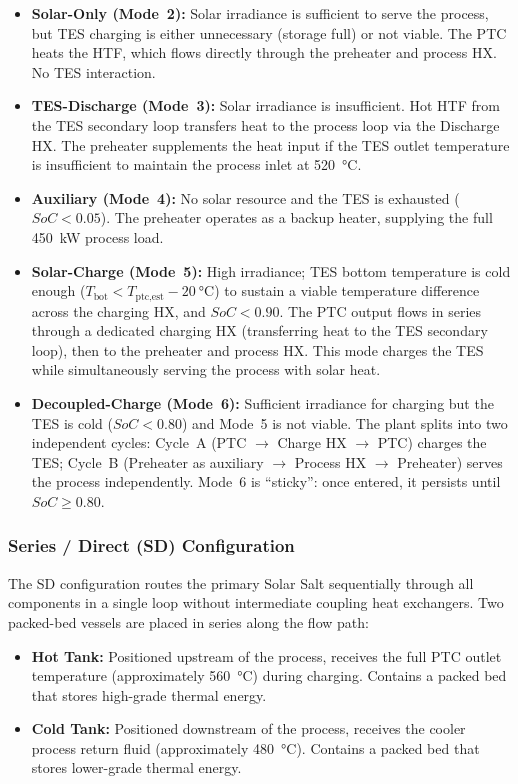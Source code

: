 \documentclass[11pt,review,3p]{elsarticle}
\begin{document}
\begin{itemize}[leftmargin=*, itemsep=4pt]
    \item \textbf{Solar-Only (Mode~2):} Solar irradiance is sufficient to serve the process, but TES charging is either unnecessary (storage full) or not viable. The PTC heats the HTF, which flows directly through the preheater and process HX. No TES interaction.
    \item \textbf{TES-Discharge (Mode~3):} Solar irradiance is insufficient. Hot HTF from the TES secondary loop transfers heat to the process loop via the Discharge HX. The preheater supplements the heat input if the TES outlet temperature is insufficient to maintain the process inlet at \SI{520}{\celsius}.
    \item \textbf{Auxiliary (Mode~4):} No solar resource and the TES is exhausted ($SoC < 0.05$). The preheater operates as a backup heater, supplying the full \SI{450}{kW} process load.
    \item \textbf{Solar-Charge (Mode~5):} High irradiance; TES bottom temperature is cold enough ($T_{\text{bot}} < T_{\text{ptc,est}} - \SI{20}{\celsius}$) to sustain a viable temperature difference across the charging HX, and $SoC < 0.90$. The PTC output flows in series through a dedicated charging HX (transferring heat to the TES secondary loop), then to the preheater and process HX. This mode charges the TES while simultaneously serving the process with solar heat.
    \item \textbf{Decoupled-Charge (Mode~6):} Sufficient irradiance for charging but the TES is cold ($SoC < 0.80$) and Mode~5 is not viable. The plant splits into two independent cycles: Cycle~A (PTC $\to$ Charge HX $\to$ PTC) charges the TES; Cycle~B (Preheater as auxiliary $\to$ Process HX $\to$ Preheater) serves the process independently. Mode~6 is ``sticky'': once entered, it persists until $SoC \ge 0.80$.
\end{itemize}

\subsubsection{Series / Direct (SD) Configuration}
\label{sec:sd_config}

The SD configuration routes the primary Solar Salt sequentially through all components in a single loop without intermediate coupling heat exchangers. Two packed-bed vessels are placed in series along the flow path:

\begin{itemize}[leftmargin=*, itemsep=4pt]
    \item \textbf{Hot Tank:} Positioned upstream of the process, receives the full PTC outlet temperature (approximately \SI{560}{\celsius}) during charging. Contains a packed bed that stores high-grade thermal energy.
    \item \textbf{Cold Tank:} Positioned downstream of the process, receives the cooler process return fluid (approximately \SI{480}{\celsius}). Contains a packed bed that stores lower-grade thermal energy.
\end{itemize}
\end{document}
